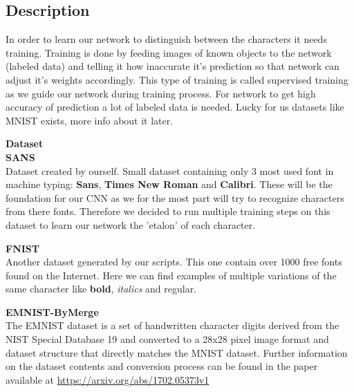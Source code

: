 \documentclass[Report.tex]{subfiles}
\begin{document}
\subsection{Description}

\begin{flushleft}
  In order to learn our network to distinguish between the characters it needs training. Training is done by feeding images of known objects to the network (labeled data) and telling it how inaccurate it's prediction so that network can adjust it's weights accordingly. This type of training is called supervised training as we guide our network during training process.
  For network to get high accuracy of prediction a lot of labeled data is needed. Lucky for us datasets like MNIST exists, more info about it later.
\end{flushleft}

\begin{flushleft}
  \textbf{Dataset} \\
  \textbf{SANS} \\
  Dataset created by ourself.
  Small dataset containing only 3 most used font in machine typing:
  \textbf{Sans}, \textbf{Times New Roman} and \textbf{Calibri}. These will be the foundation for our CNN as we for the most part will try to recognize characters from there fonts. Therefore we decided to run multiple training steps on this dataset to learn our network the 'etalon' of each character.
  
  \textbf{FNIST} \\
  Another dataset generated by our scripts. This one contain over 1000 free fonts found on the Internet. Here we can find examples of multiple variations of the  same character like \textbf{bold}, \textit{italics} and regular.
  
  \textbf{EMNIST-ByMerge} \\
  The EMNIST dataset is a set of handwritten character digits derived from the NIST Special Database 19  and converted to a 28x28 pixel image format and dataset structure that directly matches the MNIST dataset. Further information on the dataset contents and conversion process can be found in the paper available at \href{https://arxiv.org/abs/1702.05373v1}{https://arxiv.org/abs/1702.05373v1}

\end{flushleft}
\end{document}
